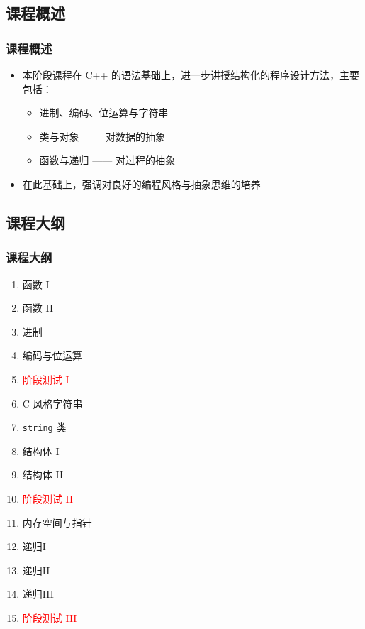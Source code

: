 \subsection{课程概述}

\begin{frame}[fragile]
    \frametitle{课程概述}

    \begin{itemize}[<+->]
        \item 本阶段课程在 C++ 的语法基础上，进一步讲授结构化的程序设计方法，主要包括：

            \begin{itemize}
                \item 进制、编码、位运算与字符串
                \item 类与对象 —— 对数据的抽象
                \item 函数与递归 —— 对过程的抽象
            \end{itemize}

        \item 在此基础上，强调对良好的编程风格与抽象思维的培养
    \end{itemize}
\end{frame}

\subsection{课程大纲}

\begin{frame}[fragile]
    \frametitle{课程大纲}

    \begin{multicols}{2}
        \begin{enumerate}
            \item<1-> 函数 I
            \item<1-> 函数 II
            \item<1-> 进制
            \item<1-> 编码与位运算
            \item<1-> \textcolor{red}{阶段测试 I}
            \item<2-> C 风格字符串
            \item<2-> \lstinline|string| 类
            \item<2-> 结构体 I
            \item<2-> 结构体 II
            \item<2-> \textcolor{red}{阶段测试 II}
            \item<3-> 内存空间与指针
            \item<3-> 递归I
            \item<3-> 递归II
            \item<3-> 递归III
            \item<3-> \textcolor{red}{阶段测试 III}
        \end{enumerate}
    \end{multicols}
\end{frame}

